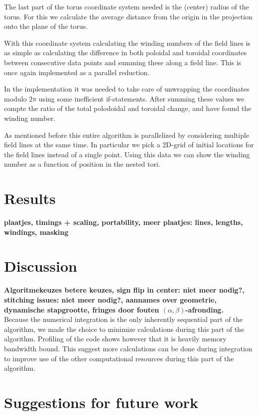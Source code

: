 \documentclass{article}
\begin{document}
The last part of the torus coordinate system needed is the (center) radius of the torus. For this we calculate the average distance from the origin in the projection onto the plane of the torus. %

With this coordinate system calculating the winding numbers of the field lines is as simple as calculating the difference in both poloidal and toroidal coordinates between consecutive data points and summing these along a field line. This is once again implemented as a parallel reduction.

In the implementation it was needed to take care of unwrapping the coordinates modulo $2\pi$ using some inefficient if-statements. %
After summing these values we compte the ratio of the total polodoidal and toroidal change, and have found the winding number.

As mentioned before this entire algorithm is parallelized by considering multiple field lines at the same time. In particular we pick a 2D-grid of initial locations for the field lines instead of a single point. Using this data we can show the winding number as a function of position in the nested tori.

\section{Results}
{\bf plaatjes, timings + scaling, portability, meer plaatjes: lines, lengths, windings, masking}

\section{Discussion}
{\bf Algoritmekeuzes \textrightarrow betere keuzes, sign flip in center: niet meer nodig?, stitching issues: niet meer nodig?, aannames over geometrie, dynamische stapgrootte, fringes door fouten $(\alpha,\beta)$-afronding.}\\
Because the numerical integration is the only inherently sequential part of the algorithm, we made the choice to minimize calculations during this part of the algorithm. Profiling of the code shows however that it is heavily memory bandwidth bound. This suggest more calculations can be done during integration to improve use of the other computational resources during this part of the algorithm.

\section{Suggestions for future work}
\end{document}
